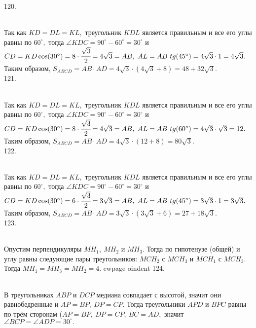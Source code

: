 120. \begin{figure}[ht!]
\end{figure}\\
Так как $KD=DL=KL,$ треугольник $KDL$ является правильным и все его углы равны по $60^\circ,$ тогда $\angle KDC=90^\circ-60^\circ=30^\circ$ и $CD=KD\cos(30^\circ)=8\cdot\cfrac{\sqrt{3}}{2}=4\sqrt{3}=AB,\ AL=AB\ tg(45^\circ)=4\sqrt{3}\cdot1=4\sqrt{3}.$ Таким образом, $S_{ABCD}=AB\cdot AD=4\sqrt{3}\cdot(4\sqrt{3}+8)=48+32\sqrt{3}.$\\
121.\begin{figure}[ht!]
\end{figure}\\
Так как $KD=DL=KL,$ треугольник $KDL$ является правильным и все его углы равны по $60^\circ,$ тогда $\angle KDC=90^\circ-60^\circ=30^\circ$ и $CD=KD\cos(30^\circ)=8\cdot\cfrac{\sqrt{3}}{2}=4\sqrt{3}=AB,\ AL=AB\ tg(60^\circ)=4\sqrt{3}\cdot\sqrt{3}=12.$ Таким образом, $S_{ABCD}=AB\cdot AD=4\sqrt{3}\cdot(12+8)=80\sqrt{3}.$\\
122. \begin{figure}[ht!]
\end{figure}\\
Так как $KD=DL=KL,$ треугольник $KDL$ является правильным и все его углы равны по $60^\circ,$ тогда $\angle KDC=90^\circ-60^\circ=30^\circ$ и $CD=KD\cos(30^\circ)=6\cdot\cfrac{\sqrt{3}}{2}=3\sqrt{3}=AB,\ AL=AB\ tg(45^\circ)=3\sqrt{3}\cdot1=3\sqrt{3}.$ Таким образом, $S_{ABCD}=AB\cdot AD=3\sqrt{3}\cdot(3\sqrt{3}+6)=27+18\sqrt{3}.$\\
123. \begin{figure}[ht!]
\end{figure}\\
Опустим перпендикуляры $MH_1,\ MH_2$ и $MH_3.$ Тогда по гипотенузе (общей) и углу равны следующие пары треугольников: $MCH_2$ с $MCH_3$ и $MCH_1$ с $MCH_3.$ Тогда $MH_1=MH_3=MH_2=4.$
ewpage
oindent
124. \begin{figure}[ht!]
\end{figure}\\
В треугольниках $ABP$ и $DCP$ медиана совпадает с высотой, значит они равнобедренные и $AP=BP,\ DP=CP.$ Тогда треугольники $APD$ и $BPC$ равны по трём сторонам ($AP=BP,\ DP=CP,\ BC=AD,$ значит $\angle BCP=\angle ADP=30^\circ.$\\
